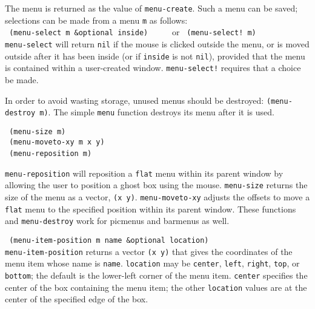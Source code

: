 The menu is returned as the value of {\tt menu-create}.  Such a menu can
be saved; selections can be made from a menu {\tt m} as follows: \\

\vspace{-0.1in}
{\tt \hspace*{0.5in} (menu-select m \&optional inside)} \ \ \ \ \ or
{\tt \hspace*{0.5in} (menu-select! m)} \\

\vspace{-0.1in}
{\tt menu-select} will return {\tt nil} if the mouse is clicked outside the
menu, or is moved outside after it has been inside (or if {\tt inside} is
not {\tt nil}), provided that the menu is contained within a user-created
window.
{\tt menu-select!} requires that a choice be made.

In order to avoid wasting storage, unused menus should be destroyed:
{\tt (menu-destroy m)}.  The simple {\tt menu} function destroys its
menu after it is used.

{\tt \hspace*{0.5in} (menu-size m)} \\
{\tt \hspace*{0.5in} (menu-moveto-xy m x y)} \\
{\tt \hspace*{0.5in} (menu-reposition m)} \

{\tt menu-reposition} will reposition a {\tt flat} menu within its parent
window by allowing the user to position a ghost box using the mouse.
{\tt menu-size} returns the size of the menu as a vector, {\tt (x y)}.
{\tt menu-moveto-xy} adjusts the offsets to move a {\tt flat} menu to
the specified position within its parent window.  These functions and
{\tt menu-destroy} work for picmenus and barmenus as well.

{\tt \hspace*{0.5in} (menu-item-position m name \&optional location)} \\

\vspace{-0.1in}
{\tt menu-item-position} returns a vector {\tt (x y)} that gives the
coordinates of the menu item whose name is {\tt name}.  {\tt location}
may be {\tt center}, {\tt left}, {\tt right}, {\tt top}, or {\tt bottom};
the default is the lower-left corner of the menu item.  {\tt center}
specifies the center of the box containing the menu item; the other
{\tt location} values are at the center of the specified edge of the box.


